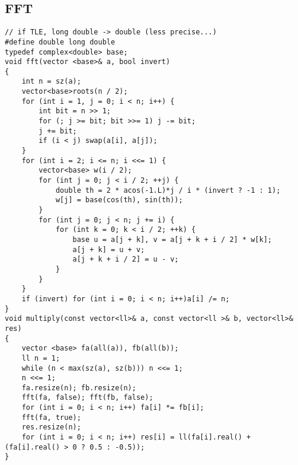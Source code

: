 \documentclass[landscape, 8pt, a4paper, oneside, twocolumn]{extarticle}
\begin{document}
\subsection{FFT}
\begin{verbatim}
// if TLE, long double -> double (less precise...)
#define double long double 
typedef complex<double> base;
void fft(vector <base>& a, bool invert)
{
	int n = sz(a);
	vector<base>roots(n / 2);
	for (int i = 1, j = 0; i < n; i++) {
		int bit = n >> 1;
		for (; j >= bit; bit >>= 1) j -= bit;
		j += bit;
		if (i < j) swap(a[i], a[j]);
	}
	for (int i = 2; i <= n; i <<= 1) {
		vector<base> w(i / 2);
		for (int j = 0; j < i / 2; ++j) {
			double th = 2 * acos(-1.L)*j / i * (invert ? -1 : 1);
			w[j] = base(cos(th), sin(th));
		}
		for (int j = 0; j < n; j += i) {
			for (int k = 0; k < i / 2; ++k) {
				base u = a[j + k], v = a[j + k + i / 2] * w[k];
				a[j + k] = u + v;
				a[j + k + i / 2] = u - v;
			}
		}
	}
	if (invert)	for (int i = 0; i < n; i++)a[i] /= n;
}
void multiply(const vector<ll>& a, const vector<ll >& b, vector<ll>& res)
{
	vector <base> fa(all(a)), fb(all(b));
	ll n = 1;
	while (n < max(sz(a), sz(b))) n <<= 1;
	n <<= 1;
	fa.resize(n); fb.resize(n);
	fft(fa, false); fft(fb, false);
	for (int i = 0; i < n; i++) fa[i] *= fb[i];
	fft(fa, true);
	res.resize(n);
	for (int i = 0; i < n; i++) res[i] = ll(fa[i].real() + (fa[i].real() > 0 ? 0.5 : -0.5));
}
\end{verbatim}
\newpage
\end{document}
